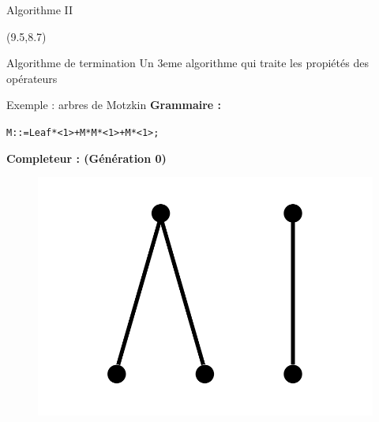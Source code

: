 \documentclass{beamer}
\begin{document}
\begin{frame}[fragile]{Algorithme II}

\begin{textblock}{5.5}(9.5,8.7)
\begin{block}{Algorithme de termination}
Un 3eme algorithme qui traite les propiétés des opérateurs
\end{block}
\end{textblock}
\begin{algorithm}[H]
\end{algorithm}
\end{frame}

\begin{frame}{Exemple : arbres de Motzkin}
\textbf{Grammaire : } \\

\begin{alltt}
\hspace{10 mm} M::= Leaf * <1> + M * M * <1> + M * <1>;
\end{alltt}
\textbf{Completeur : (Génération 0)} \\
\begin{figure}[h]
\centering
\includegraphics[scale=0.2]{const.png}
\end{figure}
\end{frame}
\end{document}
